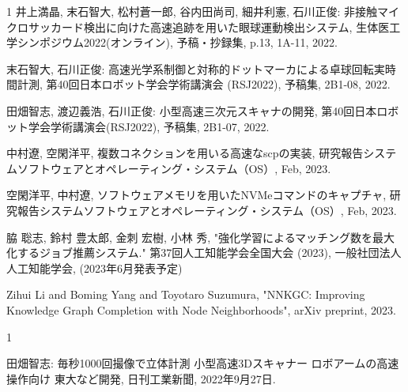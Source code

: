 \begin{発表}{1}
井上満晶, 末石智大, 松村蒼一郎, 谷内田尚司, 細井利憲, 石川正俊: 非接触マイクロサッカード検出に向けた高速追跡を用いた眼球運動検出システム, 生体医工学シンポジウム2022(オンライン), 予稿・抄録集, p.13, 1A-11, 2022.

末石智大, 石川正俊: 高速光学系制御と対称的ドットマーカによる卓球回転実時間計測, 第40回日本ロボット学会学術講演会 (RSJ2022), 予稿集, 2B1-08, 2022.


田畑智志, 渡辺義浩, 石川正俊: 小型高速三次元スキャナの開発, 第40回日本ロボット学会学術講演会(RSJ2022), 予稿集, 2B1-07, 2022.


中村遼, 空閑洋平, 複数コネクションを用いる高速なscpの実装, 研究報告システムソフトウェアとオペレーティング・システム（OS）, Feb, 2023.

空閑洋平, 中村遼, ソフトウェアメモリを用いたNVMeコマンドのキャプチャ, 研究報告システムソフトウェアとオペレーティング・システム（OS）, Feb, 2023.



脇 聡志, 鈴村 豊太郎, 金刺 宏樹, 小林 秀, "強化学習によるマッチング数を最大化するジョブ推薦システム." 第37回人工知能学会全国大会 (2023),  一般社団法人 人工知能学会, (2023年6月発表予定)


Zihui Li and Boming Yang and Toyotaro Suzumura, "NNKGC: Improving Knowledge Graph Completion with Node Neighborhoods", arXiv preprint, 2023.

\end{発表}




\begin{報道}{1}


田畑智志: 毎秒1000回撮像で立体計測 小型高速3Dスキャナー ロボアームの高速操作向け 東大など開発, 日刊工業新聞, 2022年9月27日.


\end{報道}
